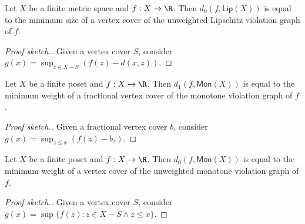 \documentclass[11pt,a4paper]{article}
\newcommand*{\Lip}[0]{\mathsf{Lip}}
\newcommand*{\Mon}[0]{\mathsf{Mon}}
\begin{document}
\begin{theorem}
  Let $X$ be a finite metric space and $f : X \to \R$.
  Then $d_0(f, \Lip(X))$ is equal to the minimum size of
  a vertex cover of the unweighted Lipschitz violation graph of $f$.
\end{theorem}
\begin{proof}[Proof sketch.]
  Given a vertex cover $S$,
  consider $g(x) = \sup_{z \in X - S}(f(z) - d(x, z))$.
\end{proof}

\begin{theorem}
  Let $X$ be a finite poset and $f : X \to \R$.
  Then $d_1(f, \Mon(X))$ is equal to the minimum weight of
  a fractional vertex cover of the monotone violation graph of $f$.
\end{theorem}
\begin{proof}[Proof sketch.]
  Given a fractional vertex cover $b$,
  consider $g(x) = \sup_{z \le x} (f(z) - b_z)$.
\end{proof}

\begin{theorem}
  Let $X$ be a finite poset and $f : X \to \R$.
  Then $d_0(f, \Mon(X))$ is equal to the minimum weight of
  a vertex cover of the unweighted monotone violation graph of $f$.
\end{theorem}
\begin{proof}[Proof sketch.]
  Given a vertex cover $S$,
  consider $g(x) = \sup\{f(z) : z \in X - S \land z \le x\}$.
\end{proof}
\end{document}
